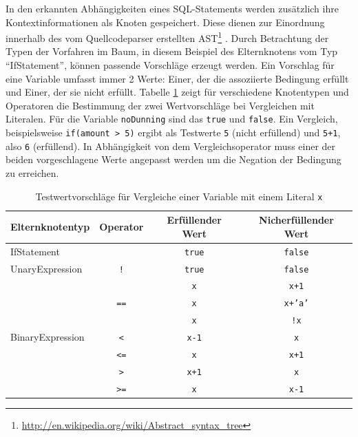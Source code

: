 In den erkannten Abhängigkeiten eines SQL-Statements werden zusätzlich ihre Kontextinformationen als Knoten gespeichert.
Diese dienen zur Einordnung innerhalb des vom Quellcodeparser erstellten AST\footnote{\url{http://en.wikipedia.org/wiki/Abstract_syntax_tree}} \cite{Horschig2014}.
Durch Betrachtung der Typen der Vorfahren im Baum, in diesem Beispiel des Elternknotens vom Typ ``IfStatement'', können passende Vorschläge erzeugt werden.
Ein Vorschlag für eine Variable umfasst immer 2 Werte: Einer, der die assoziierte Bedingung erfüllt und Einer, der sie nicht erfüllt.
Tabelle \ref{tab:tableforgeneratedvalues} zeigt für verschiedene Knotentypen und Operatoren die Bestimmung der zwei Wertvorschläge bei Vergleichen mit Literalen.
Für die Variable \texttt{noDunning} sind das \texttt{true} und \texttt{false}. 
Ein Vergleich, beispielsweise \texttt{if(amount > 5)} ergibt als Testwerte \texttt{5} (nicht erfüllend) und \texttt{5+1}, also \texttt{6} (erfüllend).
In Abhängigkeit von dem Vergleichsoperator muss einer der beiden vorgeschlagene Werte angepasst werden um die Negation der Bedingung zu erreichen.

\begin{table}[ht!]
	\centering
	\begin{tabular}{ |l|c|c|c| }
		\hline
		Elternknotentyp 								  & Operator 											& Erfüllender Wert 	& Nicherfüllender Wert\\
		\hline
		\multicolumn{2}{|l|}{IfStatement} 																& \texttt{true} 		& \texttt{false} 	\\
		\hline
		UnaryExpression 								  & \texttt{!} 										& \texttt{true} 		& \texttt{false} 	\\
		\hline
		\multirow{7}{*}{BinaryExpression} & \multirow{3}{*}{\texttt{==}} 	& \texttt{x} 				& \texttt{x+1}		\\ \cline{3-4}
																		  & 															& \texttt{x} 				& \texttt{x+'a'}	\\ \cline{3-4}
																		  & 															& \texttt{x} 				& \texttt{!x}			\\ \cline{2-4}
																		  & \texttt{<} 										& \texttt{x-1} 			& \texttt{x}			\\ \cline{2-4}
																		  & \texttt{<=} 									& \texttt{x} 				& \texttt{x+1}		\\ \cline{2-4}
																		  & \texttt{>} 										& \texttt{x+1} 			& \texttt{x}			\\ \cline{2-4}
																		  & \texttt{>=} 									& \texttt{x} 				& \texttt{x-1}		\\
		\hline
	\end{tabular}
	\caption{Testwertvorschläge für Vergleiche einer Variable mit einem Literal \texttt{x}}
	\label{tab:tableforgeneratedvalues}
\end{table}

